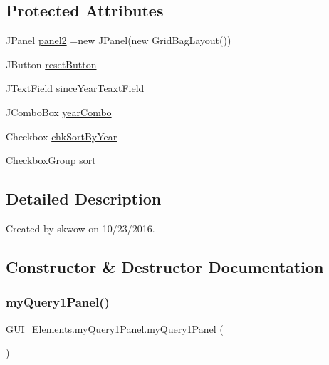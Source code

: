 \subsection*{Protected Attributes}
\begin{DoxyCompactItemize}
\item 
J\+Panel \hyperlink{class_g_u_i___elements_1_1my_query1_panel_ab923a9c569a07cdb10332b944e871903}{panel2} =new J\+Panel(new Grid\+Bag\+Layout())
\item 
J\+Button \hyperlink{class_g_u_i___elements_1_1my_query1_panel_a258a18ffc0a0a2614b3029be4765a067}{reset\+Button}
\item 
J\+Text\+Field \hyperlink{class_g_u_i___elements_1_1my_query1_panel_a960fb72a45e85925b931852ce4b218eb}{since\+Year\+Teaxt\+Field}
\item 
J\+Combo\+Box \hyperlink{class_g_u_i___elements_1_1my_query1_panel_a8327a7218462c60f0b0b9eeed6ba392c}{year\+Combo}
\item 
Checkbox \hyperlink{class_g_u_i___elements_1_1my_query1_panel_a021a96e74cad421c5dda3f8b98e3feb6}{chk\+Sort\+By\+Year}
\item 
Checkbox\+Group \hyperlink{class_g_u_i___elements_1_1my_query1_panel_a349792b04363355dc174bfbad3ac6422}{sort}
\end{DoxyCompactItemize}


\subsection{Detailed Description}
Created by skwow on 10/23/2016. 

\subsection{Constructor \& Destructor Documentation}
\hypertarget{class_g_u_i___elements_1_1my_query1_panel_a327650227b1692cbbc2f8ef90a133afc}{}\label{class_g_u_i___elements_1_1my_query1_panel_a327650227b1692cbbc2f8ef90a133afc} 
\subsubsection{\texorpdfstring{my\+Query1\+Panel()}{myQuery1Panel()}}
{\footnotesize\ttfamily G\+U\+I\+\_\+\+Elements.\+my\+Query1\+Panel.\+my\+Query1\+Panel (\begin{DoxyParamCaption}{ }\end{DoxyParamCaption})}



